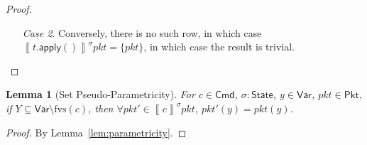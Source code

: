 \documentclass{article}
\newcommand{\pkt}{\mathit{pkt}}
\newcommand{\denote}[1]{\left\llbracket#1\right\rrbracket}
\newcommand{\Cmd}{\mathsf{Cmd}}
\newcommand{\Pkt}{\mathsf{Pkt}}
\newcommand{\Var}{\mathsf{Var}}
\newcommand{\State}{\mathsf{State}}
\newcommand{\apply}{\mathsf{apply}}
\newcommand{\fvs}{\textrm{fvs}}
\theoremstyle{plain}
\newtheorem{lemma}{Lemma}
\theoremstyle{definition}
\theoremstyle{remark}
\begin{document}
\begin{proof}
\begin{enumerate}[align=left]
\begin{enumerate}[align=left]
    \item[\textit{Case 2}.] Conversely, there is no such row, in which case
      $\denote{t.\apply()}^\sigma\pkt = \{\pkt\}$, in which case the result is
      trivial.
    \end{enumerate}
  \end{enumerate}
\end{proof}

\begin{lemma}[Set Pseudo-Parametricity]
  \label{lem:parametricity-set}
  For $c \in \Cmd$, $\sigma : \State$, $y \in \Var$, $\pkt \in \Pkt$, if $Y
  \subseteq \Var \setminus \fvs(c)$, then $\forall \pkt' \in \denote{c}^\sigma
  \pkt$, $\pkt'(y) = \pkt(y)$.
\end{lemma}

\begin{proof}
By Lemma~\ref{lem:parametricity}.
\end{proof}
\end{document}
